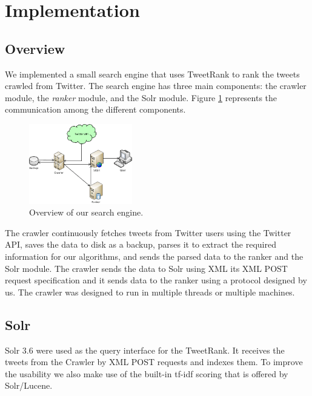 \section {Implementation}

\subsection{Overview}
We implemented a small search engine that uses TweetRank to rank the tweets crawled from Twitter. The search engine has three main components: the crawler module, the \emph{ranker} module, and the Solr module. Figure \ref{fig:overview} represents the communication among the different components.

\begin{figure}
\centering
\includegraphics[width=0.4\textwidth]{../tweetmap.png} 
\caption{Overview of our search engine.}
\label{fig:overview}
\end{figure}

The crawler continuously fetches tweets from Twitter users using the Twitter API, saves the data to disk as a backup, parses it to extract the required information for our algorithms, and sends the parsed data to the ranker and the Solr module. The crawler sends the data to Solr using XML its XML POST request specification and it sends data to the ranker using a protocol designed by us. The crawler was designed to run in multiple threads or multiple machines.





\subsection{Solr}
Solr 3.6 were used as the query interface for the TweetRank. It receives the tweets from the Crawler by XML POST requests and indexes them. To improve the usability we also make use of the built-in tf-idf scoring that is offered by Solr/Lucene.

